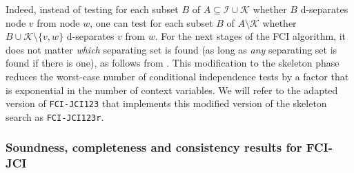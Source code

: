 \documentclass[twoside,11pt]{article}
\newcommand\C[1]{\mathcal{#1}}
\newcommand{\alg}[1]{\texttt{#1}}
\begin{document}
Indeed, instead of testing for each subset $B$ of $A \subseteq \C{I} \cup \C{K}$ whether $B$ d-separates node $v$ from node $w$, one can test for each subset $B$ of $A \setminus \C{K}$ whether $B \cup \C{K} \setminus \{v,w\}$ d-separates $v$ from $w$.
For the next stages of the FCI algorithm, it does not matter \emph{which} separating set is found (as long as \emph{any} separating set is found if there is one), as follows from \citet[Lemma 3.2.1 and 3.2.2]{Zhang2006}.
This modification to the skeleton phase reduces the worst-case number of conditional independence tests by a factor that is exponential in the number of context variables. 
We will refer to the adapted version of \alg{FCI-JCI123} that implements this modified version of the skeleton search as \alg{FCI-JCI123r}. 

\subsubsection{Soundness, completeness and consistency results for FCI-JCI}
\end{document}
